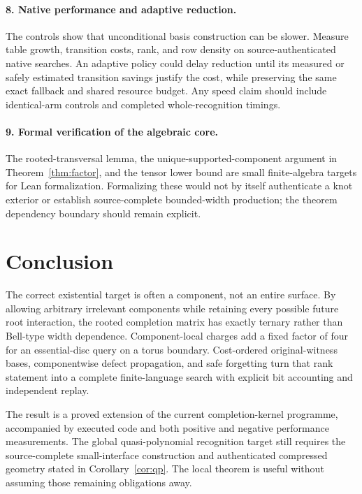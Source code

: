 \documentclass[11pt,letterpaper]{article}
\theoremstyle{definition}
\begin{document}
\paragraph{8. Native performance and adaptive reduction.}
The controls show that unconditional basis construction can be slower. Measure table growth, transition costs, rank, and row density on source-authenticated native searches. An adaptive policy could delay reduction until its measured or safely estimated transition savings justify the cost, while preserving the same exact fallback and shared resource budget. Any speed claim should include identical-arm controls and completed whole-recognition timings.

\paragraph{9. Formal verification of the algebraic core.}
The rooted-transversal lemma, the unique-supported-component argument in Theorem~\ref{thm:factor}, and the tensor lower bound are small finite-algebra targets for Lean formalization. Formalizing these would not by itself authenticate a knot exterior or establish source-complete bounded-width production; the theorem dependency boundary should remain explicit.

\section{Conclusion}
The correct existential target is often a component, not an entire surface. By allowing arbitrary irrelevant components while retaining every possible future root interaction, the rooted completion matrix has exactly ternary rather than Bell-type width dependence. Component-local charges add a fixed factor of four for an essential-disc query on a torus boundary. Cost-ordered original-witness bases, componentwise defect propagation, and safe forgetting turn that rank statement into a complete finite-language search with explicit bit accounting and independent replay.

The result is a proved extension of the current completion-kernel programme, accompanied by executed code and both positive and negative performance measurements. The global quasi-polynomial recognition target still requires the source-complete small-interface construction and authenticated compressed geometry stated in Corollary~\ref{cor:qp}. The local theorem is useful without assuming those remaining obligations away.

\appendix
\end{document}
